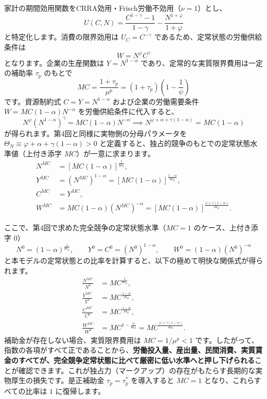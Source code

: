 \documentclass[
  japanese,
  lualatex,
  ja=standard,
  12pt,
  a4paper]{ltjsarticle}
\begin{document}
家計の期間効用関数をCRRA効用・Frisch労働不効用（\(\nu=1\)）とし、 \[
U(C, N) = \frac{C^{1-\gamma}-1}{1-\gamma} - \frac{N^{1+\varphi}}{1+\varphi}
\] と特定化します。消費の限界効用は \(U_C = C^{-\gamma}\)
であるため、定常状態の労働供給条件は \[
W = N^\varphi C^\gamma
\] となります。企業の生産関数は \(Y = N^{1-\alpha}\)
であり、定常的な実質限界費用は一定の補助率 \(\tau_p\) のもとで \[
MC = \frac{1+\tau_p}{\mu^p} = (1+\tau_p) \left( 1 - \frac{1}{\psi} \right)
\] です。資源制約式 \(C = Y = N^{1-\alpha}\) および企業の労働需要条件
\(W = MC (1-\alpha) N^{-\alpha}\) を労働供給条件に代入すると、 \[
N^\varphi \left( N^{1-\alpha} \right)^\gamma = MC (1-\alpha) N^{-\alpha} \implies N^{\varphi + \alpha + \gamma(1-\alpha)} = MC (1-\alpha)
\] が得られます。第4回と同様に実物側の分母パラメータを
\(\Theta_N \equiv \varphi + \alpha + \gamma(1-\alpha) > 0\)
と定義すると、独占的競争のもとでの定常状態水準値（上付き添字
\(MC\)）が一意に求まります。 \[
\begin{aligned}
N^{MC} &= \left[ MC (1-\alpha) \right]^{\frac{1}{\Theta_N}},\\
Y^{MC} &= (N^{MC})^{1-\alpha} = \left[ MC (1-\alpha) \right]^{\frac{1-\alpha}{\Theta_N}},\\
C^{MC} &= Y^{MC},\\
W^{MC} &= MC (1-\alpha) (N^{MC})^{-\alpha} = \left[ MC (1-\alpha) \right]^{\frac{\varphi + \gamma(1-\alpha)}{\Theta_N}}.
\end{aligned}
\]

ここで、第4回で求めた完全競争の定常状態水準（\(MC = 1\)
のケース、上付き添字 \(0\)） \[
N^0 = (1-\alpha)^{\frac{1}{\Theta_N}}, \qquad Y^0 = C^0 = (N^0)^{1-\alpha}, \qquad W^0 = (1-\alpha) (N^0)^{-\alpha}
\]
と本モデルの定常状態との比率を計算すると、以下の極めて明快な関係式が得られます。
\[
\begin{aligned}
\frac{N^{MC}}{N^0} &= MC^{\frac{1}{\Theta_N}},\\
\frac{Y^{MC}}{Y^0} &= MC^{\frac{1-\alpha}{\Theta_N}},\\
\frac{C^{MC}}{C^0} &= MC^{\frac{1-\alpha}{\Theta_N}},\\
\frac{W^{MC}}{W^0} &= MC^{1 - \frac{\alpha}{\Theta_N}} = MC^{\frac{\varphi + \gamma(1-\alpha)}{\Theta_N}}.
\end{aligned}
\] 補助金が存在しない場合、実質限界費用は \(MC = 1/\mu^p < 1\)
です。したがって、指数の各項がすべて正であることから、\textbf{労働投入量、産出量、民間消費、実質賃金のすべてが、完全競争定常状態に比べて厳密に低い水準へと押し下げられる}ことが確認できます。これが独占力（マークアップ）の存在がもたらす長期的な実物厚生の損失です。是正補助金
\(\tau_p = \tau_p^*\) を導入すると \(MC = 1\)
となり、これらすべての比率は \(1\) に復帰します。
\end{document}
